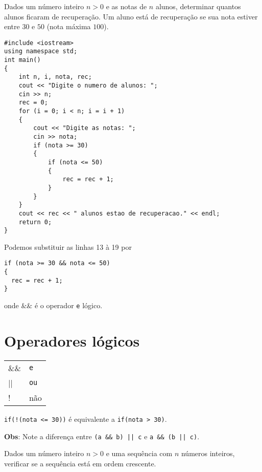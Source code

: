 \documentclass[a4paper]{memoir}
\begin{document}
\begin{prob}\label{prob108.cpp}
Dados um número inteiro $n > 0$ e as notas de $n$ alunos, determinar quantos alunos ficaram de recuperação. Um aluno está de recuperação se sua nota estiver entre $30$ e $50$ (nota máxima $100$).
\end{prob}

\begin{sol}
\begin{lstlisting}
#include <iostream>
using namespace std;
int main()
{
    int n, i, nota, rec;
    cout << "Digite o numero de alunos: ";
    cin >> n;
    rec = 0;
    for (i = 0; i < n; i = i + 1)
    {
        cout << "Digite as notas: ";
        cin >> nota;
        if (nota >= 30)
        {
            if (nota <= 50)
            {
                rec = rec + 1;
            }
        }
    }
    cout << rec << " alunos estao de recuperacao." << endl;
    return 0;
}
\end{lstlisting}
\end{sol}

Podemos substituir as linhas 13 à 19 por

\begin{lstlisting}
if (nota >= 30 && nota <= 50)
{
  rec = rec + 1;
}
\end{lstlisting}

\noindent onde $\&\&$ é o operador \verb|e| lógico.

\section{Operadores lógicos}

\begin{center}
\begin{tabular}{l|l}
  \&\&  & \verb|e| \\
  ||  & \verb|ou| \\
  !  & não \\
\end{tabular}
\end{center}

\begin{ex}
\verb|if(!(nota <= 30))| é equivalente a \verb|if(nota > 30)|.
\end{ex}

\textbf{Obs}: Note a diferença entre \verb"(a && b) || c" e \verb"a && (b || c)".

\begin{prob}\label{prob109.cpp}
Dados um número inteiro $n > 0$ e uma sequência com $n$ números inteiros, verificar se a sequência está em ordem crescente.
\end{prob}
\end{document}
